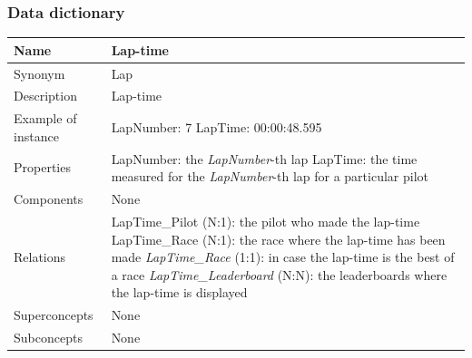 \documentclass{beamer}
\begin{document}
\begin{frame}
\frametitle{Data dictionary}
\begin{table}
\tiny
\begin{tabular}{|p{2cm}|p{6cm}|}
\hline
Name & \textbf{Lap-time} \\
\hline
Synonym & Lap \\
\hline
Description & Lap-time \\
\hline
Example of instance &
LapNumber: 7 \newline
LapTime: 00:00:48.595 \\
\hline
Properties &
LapNumber: the \textit{LapNumber}-th lap \newline
LapTime: the time measured for the \textit{LapNumber}-th lap for 
a particular pilot \\
\hline
Components & None \\
\hline
Relations & 
LapTime\_Pilot (N:1): the pilot who made the lap-time \newline
LapTime\_Race (N:1): the race where the lap-time has been made \newline
\textit{LapTime\_Race} (1:1): in case the lap-time is the best of a race \newline
\textit{LapTime\_Leaderboard} (N:N): the leaderboards where the lap-time is displayed \\
\hline
Superconcepts & None \\
\hline
Subconcepts & None \\
\hline
\end{tabular}
\end{table}
\end{frame}
\end{document}
